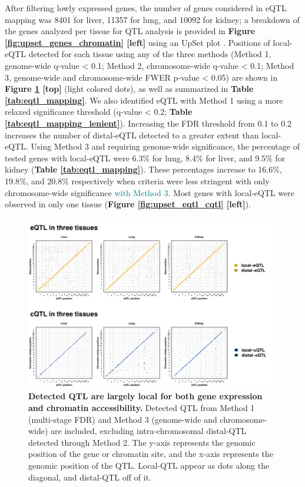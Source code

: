 \documentclass[9pt,twocolumn,twoside]{gsajnl}
\newcommand{\GKinline}[1]{\textcolor{teal}{#1}}
\begin{document}
After filtering lowly expressed genes, the number of genes considered in eQTL mapping was 8401 for liver, 11357 for lung, and 10092 for kidney; a breakdown of the genes analyzed per tissue for QTL analysis is provided in \textbf{Figure \ref{fig:upset_genes_chromatin} [left]} using an UpSet plot \citep{Conway2017}. Positions of local-eQTL detected for each tissue using any of the three methods (Method 1, genome-wide q-value < 0.1; Method 2, chromosome-wide q-value < 0.1; Method 3, genome-wide and chromosome-wide FWER p-value < 0.05)  are shown in \textbf{Figure \ref{fig:grid_plot} [top]} (light colored dots), as well as summarized in \textbf{Table \ref{tab:eqtl_mapping}}. We also identified eQTL with Method 1 using a more relaxed significance threshold (q-value < 0.2; \textbf{Table \ref{tab:eqtl_mapping_lenient}}). Increasing the FDR threshold from 0.1 to 0.2 increases the number of distal-eQTL detected to a greater extent than local-eQTL. Using Method 3 and requiring genome-wide significance, the percentage of tested genes with local-eQTL were 6.3\% for lung, 8.4\% for liver, and 9.5\% for kidney (\textbf{Table \ref{tab:eqtl_mapping}}). These percentages increase to 16.6\%, 19.8\%, and 20.8\% respectively when criteria were less stringent with only chromosome-wide significance \GKinline{with Method 3}. Most genes with local-eQTL were observed in only one tissue (\textbf{Figure \ref{fig:upset_eqtl_cqtl} [left]}).

\begin{figure}[h]
\renewcommand{\familydefault}{\sfdefault}\normalfont
\centering
\includegraphics[width=\textwidth, trim={0in 0in 0in 0in}, clip]{figs/qtl_map_main.pdf}
\caption{\textbf{Detected QTL are largely local for both gene expression and chromatin accessibility.} Detected QTL from Method 1 (multi-stage FDR) and Method 3 (genome-wide and chromosome-wide) are included, excluding intra-chromosomal distal-QTL detected through Method 2. The y-axis represents the genomic position of the gene or chromatin site, and the x-axis represents the genomic position of the QTL. Local-QTL appear as dots along the diagonal, and distal-QTL off of it.
\label{fig:grid_plot}}
\end{figure}
\end{document}
